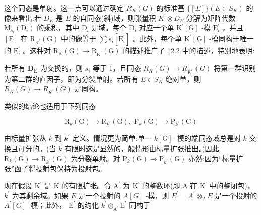 \documentclass[10pt]{article}
\begin{document}
这个同态是单射。这一点可以通过确定 \({R}_{K}\left( G\right)\) 的标准基 \(\{ \left\lbrack  E\right\rbrack  \} \left( {E \in  {S}_{K}}\right)\) 的像来看出:若 \({D}_{E}\) 是 \(E\) 的自同态(斜)域，则张量积 \({K}^{\prime } \otimes  {D}_{E}\) 分解为矩阵代数 \({\mathrm{M}}_{{s}_{i}}\left( {\mathrm{D}}_{i}\right)\) 的乘积，其中 \({\mathrm{D}}_{i}\) 是域。每个 \({\mathrm{D}}_{i}\) 对应一个单 \({\mathrm{K}}^{\prime }\left\lbrack  \mathrm{G}\right\rbrack\) -模 \({\mathrm{E}}_{i}^{\prime }\) ，并且 \(\left\lbrack  \mathrm{E}\right\rbrack\) 在 \({\mathrm{R}}_{{\mathrm{K}}^{\prime }}\left( \mathrm{G}\right)\) 中的像等于 \(\sum {s}_{i}\left\lbrack  {\mathrm{E}}_{i}^{\prime }\right\rbrack\) 。此外，每个单 \({\mathrm{K}}^{\prime }\left\lbrack  \mathrm{G}\right\rbrack\) -模同构于唯一的 \({\mathrm{E}}_{i}^{\prime }\) 。这种对 \({\mathrm{R}}_{\mathrm{K}}\left( \mathrm{G}\right)  \rightarrow  {\mathrm{R}}_{{\mathrm{K}}^{\prime }}\left( \mathrm{G}\right)\) 的描述推广了 12.2 中的描述，特别地表明:

若所有 \({\mathbf{D}}_{\mathbf{E}}\) 为交换的，则 \({s}_{i}\) 等于 1，且同态 \({R}_{K}\left( G\right)  \rightarrow  {R}_{{K}^{\prime }}\left( G\right)\) 将第一群识别为第二群的直因子，即为分裂单射。若所有 \(E \in  {S}_{K}\) 绝对单，则 \({R}_{K}\left( G\right)  \rightarrow  {R}_{{K}^{\prime }}\left( G\right)\) 是同构。

类似的结论也适用于下列同态

\[
{\mathrm{R}}_{k}\left( \mathrm{G}\right)  \rightarrow  {\mathrm{R}}_{{k}^{\prime }}\left( \mathrm{G}\right) ,\;{\mathrm{P}}_{k}\left( \mathrm{G}\right)  \rightarrow  {\mathrm{P}}_{{k}^{\prime }}\left( \mathrm{G}\right)
\]

由标量扩张从 \(k\) 到 \({k}^{\prime }\) 定义。情况更为简单:单一 \(k\left\lbrack  \mathrm{G}\right\rbrack\) -模的端同态域总是对 \(k\) 交换且可分的。(当 \(k\) 有限时这是显然的，般情形由标量扩张推出。)因此 \({\mathrm{R}}_{k}\left( \mathrm{G}\right)  \rightarrow  {\mathrm{R}}_{{k}^{\prime }}\left( \mathrm{G}\right)\) 为分裂单射。对 \({\mathrm{P}}_{k}\left( \mathrm{G}\right)  \rightarrow  {\mathrm{P}}_{{k}^{\prime }}\left( \mathrm{G}\right)\) 亦然:因为“标量扩张”函子将投射包保持为投射包。

现在假设 \({\mathrm{K}}^{\prime }\) 是 \(\mathrm{K}\) 的有限扩张。令 \({\mathrm{A}}^{\prime }\) 为 \({\mathrm{K}}^{\prime }\) 的整数环(即 \(\mathrm{A}\) 在 \({\mathrm{K}}^{\prime }\) 中的整闭包)， \({k}^{\prime }\) 为其剩余域。如果 \(E\) 是一个投射的 \(A\left\lbrack  G\right\rbrack\) -模，则 \({E}^{\prime } = {A}^{\prime }{ \otimes  }_{A}E\) 是一个投射的 \({A}^{\prime }\left\lbrack  G\right\rbrack\) -模；此外， \({\mathrm{E}}^{\prime }\) 的约化 \({k}^{\prime }{ \otimes  }_{{\mathrm{A}}^{\prime }}{\mathrm{E}}^{\prime }\) 同构于
\end{document}

